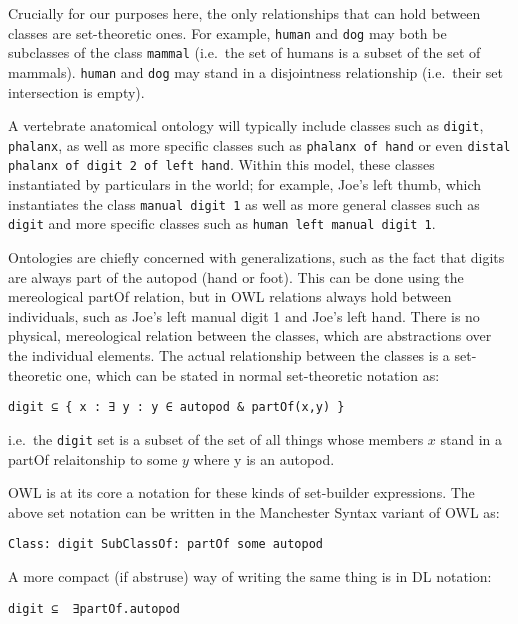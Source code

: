 Crucially for our purposes here, the only relationships that can hold
between classes are set-theoretic ones. For example, \texttt{human} and
\texttt{dog} may both be subclasses of the class \texttt{mammal}
(i.e.~the set of humans is a subset of the set of mammals).
\texttt{human} and \texttt{dog} may stand in a disjointness relationship
(i.e.~their set intersection is empty).

A vertebrate anatomical ontology will typically include classes such as
\texttt{digit}, \texttt{phalanx}, as well as more specific classes such
as \texttt{phalanx of hand} or even
\texttt{distal phalanx of digit 2 of left hand}. Within this model,
these classes instantiated by particulars in the world; for example,
Joe's left thumb, which instantiates the class \texttt{manual digit 1}
as well as more general classes such as \texttt{digit} and more specific
classes such as \texttt{human left manual digit 1}.

Ontologies are chiefly concerned with generalizations, such as the fact
that digits are always part of the autopod (hand or foot). This can be
done using the mereological partOf relation, but in OWL relations always
hold between individuals, such as Joe's left manual digit 1 and Joe's
left hand. There is no physical, mereological relation between the
classes, which are abstractions over the individual elements. The actual
relationship between the classes is a set-theoretic one, which can be
stated in normal set-theoretic notation as:

\begin{verbatim}
digit ⊆ { x : ∃ y : y ∈ autopod & partOf(x,y) }
\end{verbatim}

i.e.~the \texttt{digit} set is a subset of the set of all things whose
members $x$ stand in a partOf relaitonship to some $y$ where y is an
autopod.

OWL is at its core a notation for these kinds of set-builder
expressions. The above set notation can be written in the Manchester
Syntax\cite{Horridge} variant of OWL as:

\begin{verbatim}
Class: digit SubClassOf: partOf some autopod
\end{verbatim}

A more compact (if abstruse) way of writing the same thing is in DL
notation:

\begin{verbatim}
digit ⊆  ∃partOf.autopod
\end{verbatim}

